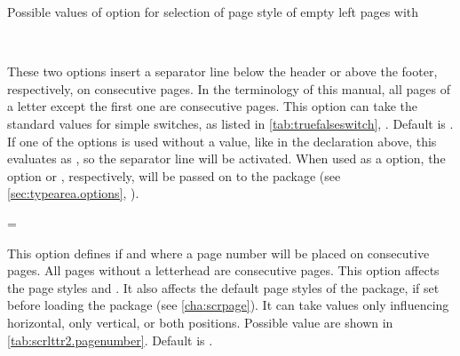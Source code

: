 \begin{table}
  \caption[{Possible values of option  with
    }]{Possible values of option  for
    selection of page style of empty left pages with }
  \label{tab:scrlttr2.cleardoublepage}
  \begin{desctabular}
  \end{desctabular}
\end{table}
%
%

\begin{Declaration}
  \\
\end{Declaration}
%
%
These two options insert a separator line below the header or above
the footer, respectively, on consecutive pages. In the terminology of
this manual, all pages of a letter except the first one are
consecutive pages.  This option can take the standard values for
simple switches, as listed in
\autoref{tab:truefalseswitch},
. Default is
. If one of the options is used without a value, like in
the declaration above, this evaluates as , so the
separator line will be activated. When used as a 
option, the option  or ,
respectively, will be passed on to the  package (see
\autoref{sec:typearea.options},
).
%
%
%

\begin{Declaration}
  =
\end{Declaration}
%
This option defines if and where a page number will be placed on
consecutive pages. All pages without a letterhead are consecutive
pages. This option affects the page styles
 and . It also affects the default page
styles of the  package, if set before loading the
package (see \autoref{cha:scrpage}). It can take values only
influencing horizontal, only vertical, or both positions. Possible
value are shown in \autoref{tab:scrlttr2.pagenumber}. Default is
.

